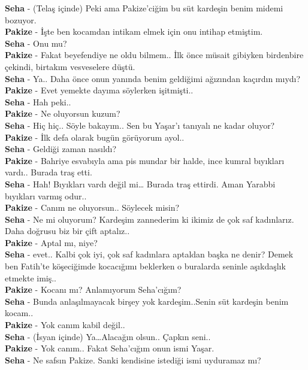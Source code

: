 \documentclass[]{book}
\begin{document}
\textbf{Seha} - (Telaş içinde) Peki ama Pakize'ciğim bu süt kardeşin benim midemi bozuyor.\\
\textbf{Pakize} - İşte ben kocamdan intikam elmek için onu intihap etmiştim.\\
\textbf{Seha} - Onu mu?\\
\textbf{Pakize} - Fakat beyefendiye ne oldu bilmem.. İlk önce müsait gibiyken birdenbire çekindi, birtakım vesveselere düştü.\\
\textbf{Seha} - Ya.. Daha önce onun yanında benim geldiğimi ağızından kaçırdın mıydı?\\
\textbf{Pakize} - Evet yemekte dayıma söylerken işitmişti..\\
\textbf{Seha} - Hah peki..\\
\textbf{Pakize} - Ne oluyorsun kuzum?\\
\textbf{Seha} - Hiç hiç.. Söyle bakayım.. Sen bu Yaşar'ı tanıyalı ne kadar oluyor?\\
\textbf{Pakize} - İlk defa olarak bugün görüyorum ayol..\\
\textbf{Seha} - Geldiği zaman nasıldı?\\
\textbf{Pakize} - Bahriye esvabıyla ama pis mundar bir halde, ince kumral bıyıkları vardı.. Burada traş etti.\\
\textbf{Seha} - Hah! Bıyıkları vardı değil mi\ldots{} Burada traş ettirdi. Aman Yarabbi bıyıkları varmış odur..\\
\textbf{Pakize} - Canım ne oluyorsun.. Söylecek misin?\\
\textbf{Seha} - Ne mi oluyorum? Kardeşim zannederim ki ikimiz de çok saf kadınlarız. Daha doğrusu biz bir çift aptalız..\\
\textbf{Pakize} - Aptal mı, niye?\\
\textbf{Seha} - evet.. Kalbi çok iyi, çok saf kadınlara aptaldan başka ne denir? Demek ben Fatih'te köşeciğimde kocacığımı beklerken o buralarda seninle aşıkdaşlık etmekte imiş..\\
\textbf{Pakize} - Kocanı mı? Anlamıyorum Seha'cığım?\\
\textbf{Seha} - Bunda anlaşılmayacak birşey yok kardeşim..Senin süt kardeşin benim kocam..\\
\textbf{Pakize} - Yok canım kabil değil..\\
\textbf{Seha} - (İsyan içinde) Ya\ldots Alacağın olsun.. Çapkın seni..\\
\textbf{Pakize} - Yok canım.. Fakat Seha'cığım onun ismi Yaşar.\\
\textbf{Seha} - Ne safsın Pakize. Sanki kendisine istediği ismi uyduramaz mı?\\
\end{document}
